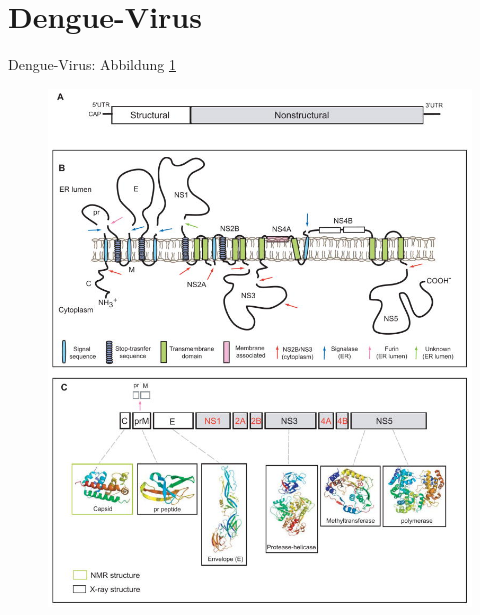 \documentclass[german,version-2022-01]{uzl-thesis}
\begin{document}
\section{Dengue-Virus}
Dengue-Virus: Abbildung \ref{fig:Dengue_virus_overview} \\
\begin{figure}[htpb]
  \centering
  \includegraphics[scale=1]{Images/Dengue_virus_overview.jpg}
  \caption{ \cite{perera_structural_2008}}
  \label{fig:Dengue_virus_overview}
\end{figure} 
\end{document}
